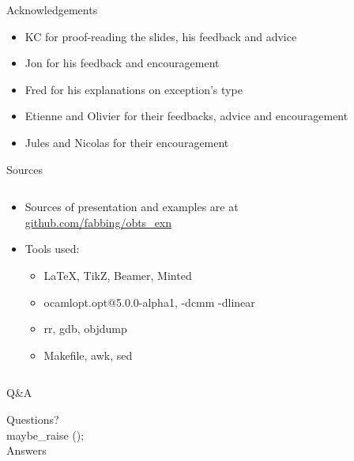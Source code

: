 \begin{frame}{Acknowledgements}
  \begin{itemize}
    \item KC for proof-reading the slides, his feedback and advice
    \item Jon for his feedback and encouragement
    \item Fred for his explanations on exception's type
    \item Etienne and Olivier for their feedbacks, advice and encouragement
    \item Jules and Nicolas for their encouragement
  \end{itemize}
\end{frame}

\begin{frame}{Sources}
  \begin{columns}[c]
    \begin{column}{0.4\textwidth}
      \begin{itemize}
        \item Sources of presentation and examples are at \href{https://github.com/fabbing/obts\_exn}{github.com/fabbing/obts\_exn}
        \item Tools used:
          \begin{itemize}
            \item LaTeX, TikZ, Beamer, Minted
            \item ocamlopt.opt@5.0.0-alpha1, -dcmm -dlinear
            \item rr, gdb, objdump
            \item Makefile, awk, sed
          \end{itemize}
      \end{itemize}
    \end{column}
    \begin{column}{0.6\textwidth}
      \centering
    \end{column}
  \end{columns}
\end{frame}

\begin{frame}{Q\&A}
  \begin{center}
    \large Questions?\\
    \smallskip
    \large maybe\_raise ();\\
    \large Answers\\
  \end{center}
\end{frame}
